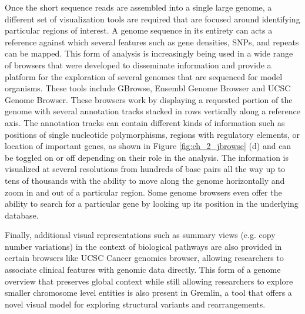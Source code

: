 Once the short sequence reads are assembled into a single large genome, a different set of visualization tools are required that are focused around identifying particular regions of interest. A genome sequence in its entirety can acts a reference against which several features such as gene densities, SNPs, and repeats can be mapped. This form of analysis is increasingly being used in a wide range of browsers that were developed to disseminate information and provide a platform for the exploration of several genomes that are sequenced for model organisms. These tools include GBrowse\cite{stein2002generic}, Ensembl Genome Browser\cite{stalker2004ensembl} and UCSC Genome Browser\cite{ucscgenome}. These browsers work by displaying a requested portion of the genome with several annotation tracks stacked in rows vertically along a reference axis. The annotation tracks can contain different kinds of information such as positions of single nucleotide polymorphisms, regions with regulatory elements, or location of important genes, as shown in Figure \ref{fig:ch_2_jbrowse} (d) and can be toggled on or off depending on their role in the analysis. The information is visualized at several resolutions from hundreds of base pairs all the way up to tens of thousands with the ability to move along the genome horizontally and zoom in and out of a particular region. Some genome browsers even offer the ability to search for a particular gene by looking up its position in the underlying database\cite{nielsen2010visualizing}. 

Finally, additional visual representations such as summary views (e.g. copy number variations) in the context of biological pathways are also provided in certain browsers like UCSC Cancer genomics browser\cite{ucscgenome}, allowing researchers to associate clinical features with genomic data directly. This form of a genome overview that preserves global context while still allowing researchers to explore smaller chromosome level entities is also present in Gremlin, a tool that offers a novel visual model for exploring structural variants and rearrangements\cite{o2010gremlin}.  

